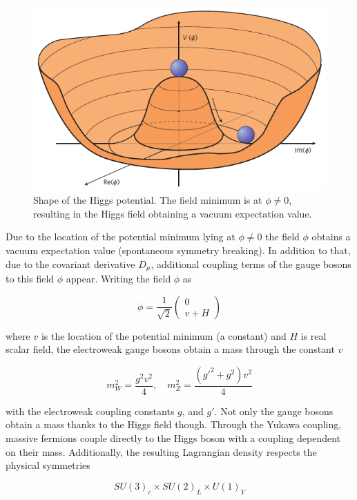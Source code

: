\begin{figure}[h!]
	\centering
	\includegraphics[width=0.8\linewidth]{figures/theory/higgspotential}
	\caption{Shape of the Higgs potential. The field minimum is at $\phi \neq 0$, resulting in the Higgs field obtaining a vacuum expectation value. \cite{Ellis:2012465}}
	\label{fig:mexicanhat}
\end{figure}

Due to the location of the potential minimum lying at $\phi \neq 0$ the field $\phi$ obtains a vacuum expectation value (spontaneous symmetry breaking). In addition to that, due to the covariant derivative $D_\mu$, additional coupling terms of the gauge bosons to this field $\phi$ appear. Writing the field $\phi$ as

\begin{equation*}
	\phi = \frac{1}{\sqrt{2}}\left(\begin{matrix}
		0 \\
		v + H
	\end{matrix}
	\right)
\end{equation*}

where $v$ is the location of the potential minimum (a constant) and $H$ is real scalar field, the electroweak gauge bosons  obtain a mass through the constant $v$

\begin{equation*}
	m^2_W = \frac{g^2 v^2}{4}, \quad m^2_Z = \frac{(g'^2 + g^2)v^2}{4}
\end{equation*}

with the electroweak coupling constants $g$, and $g'$. Not only the gauge bosons obtain a mass thanks to the Higgs field though. Through the Yukawa coupling, massive fermions couple directly to the Higgs boson with a coupling dependent on their mass. Additionally, the resulting Lagrangian density respects the physical symmetries

\begin{equation*}
	SU(3)_c \times SU(2)_L \times U(1)_Y
\end{equation*}

